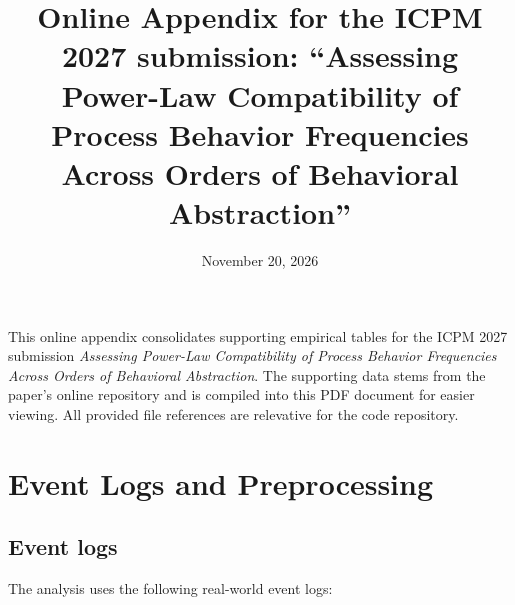 \documentclass[11pt,a4paper]{article}
\title{Online Appendix for the ICPM 2027 submission: ``Assessing Power-Law Compatibility of Process Behavior Frequencies Across Orders of Behavioral Abstraction''}
\author{}
\date{November 20, 2026}
\begin{document}

\maketitle

\noindent
This online appendix consolidates supporting empirical tables for the ICPM 2027 submission \textit{Assessing Power-Law Compatibility of Process Behavior Frequencies Across Orders of Behavioral Abstraction}.
The supporting data stems from the paper's online repository and is compiled into this PDF document for easier viewing.
All provided file references are relevative for the code repository.

\setcounter{tocdepth}{3}
\renewcommand{\contentsname}{Contents}
{\small\tableofcontents}

\section{Event Logs and Preprocessing}
\label{sec:preprocessing}

\subsection{Event logs}
\label{sec:event-logs}

The analysis uses the following real-world event logs:
\end{document}
